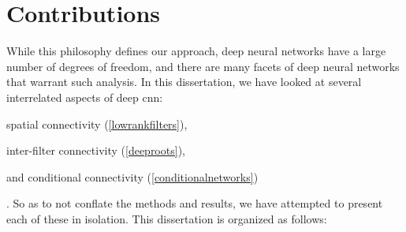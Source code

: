 \documentclass[thesis]{subfiles}
\begin{document}
\section{Contributions}
While this philosophy defines our approach, deep neural networks have a large number of degrees of freedom, and there are many facets of deep neural networks that warrant such analysis. In this dissertation, we have looked at several interrelated aspects of deep \gls{cnn}:
\begin{enumerate*}[label=(\textbf{\roman*)}]
\item spatial connectivity (\cref{lowrankfilters}),
\item inter-filter connectivity (\cref{deeproots}),
\item and conditional connectivity (\cref{conditionalnetworks})
\end{enumerate*}.
So as to not conflate the methods and results, we have attempted to present each of these in isolation. 
This dissertation is organized as follows:
\end{document}
